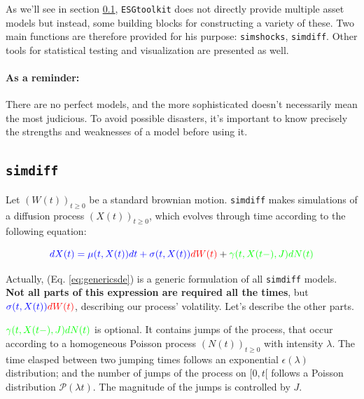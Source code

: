 \documentclass[a4paper]{article}\usepackage[]{graphicx}\usepackage[]{color}
\newcommand{\code}[1]{\mbox{\texttt{#1}}}
\begin{document}
As we'll see in section \ref{sec:simdiff}, \code{ESGtoolkit} does not directly provide multiple asset models but instead, some building blocks for constructing a variety of these. Two main functions are therefore provided for his purpose: \code{simshocks}, \code{simdiff}. Other tools for statistical testing and visualization are presented as well.

\paragraph{As a reminder:}
\label{para}
There are no perfect models, and the more sophisticated doesn't necessarily mean the most judicious. To avoid possible disasters, it's important to know precisely the strengths and weaknesses of a model before using it.

\subsection{\code{simdiff}}
\label{sec:simdiff}

Let $(W(t))_{t \geq 0}$ be a standard brownian motion. \code{simdiff} makes simulations of a  diffusion process $(X(t))_{t \geq 0}$, which evolves through time according to the following equation: 

\begin{equation}
\label{eq:genericsde}
\textcolor{blue}{dX(t) = \mu(t, X(t)) dt + \sigma(t, X(t))} \textcolor{red}{dW(t)} + \textcolor{green}{\gamma(t, X(t-), J)dN(t)}
\end{equation}

\medskip

Actually, (Eq. \ref{eq:genericsde}) is a generic formulation of all \code{simdiff} models. {\bf Not all parts of this expression are required all the times}, but $\textcolor{blue}{\sigma(t, X(t))} \textcolor{red}{dW(t)}$, describing our process' volatility. Let's describe the other parts. 

\medskip

$\textcolor{green}{\gamma(t, X(t-), J) dN(t)}$ is optional. It contains jumps of the process, that occur according to a homogeneous Poisson process $(N(t))_{t \geq 0}$ with  intensity $\lambda$. The time elasped between two jumping times follows an exponential $\epsilon(\lambda)$ distribution; and the number of jumps of the process on $[0, t[$ follows a Poisson distribution $\mathcal{P}(\lambda t)$. The magnitude of the jumps is controlled by $J$.    

\medskip
\end{document}
